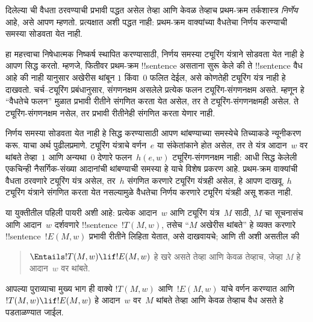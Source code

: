 \documentclass[../../../include/open-logic-section]{subfiles}
\begin{document}

दिलेल्या ची वैधता ठरवण्याची
प्रभावी पद्धत असेल तेव्हा आणि केवळ तेव्हाच
प्रथम-क्रम तर्कशास्त्र \emph{निर्णेय} आहे,
असे आपण म्हणतो. प्रत्यक्षात अशी पद्धत नाही:
प्रथम-क्रम वाक्यांच्या वैधतेचा निर्णय
करण्याची समस्या सोडवता येत नाही.

हा महत्त्वाचा निषेधात्मक निष्कर्ष स्थापित
करण्यासाठी, निर्णय समस्या ट्यूरिंग यंत्राने
सोडवता येत नाही हे आपण सिद्ध करतो.
म्हणजे, फितीवर प्रथम-क्रम !!{sentence}
असताना सुरू केले की ते !!{sentence} वैध
आहे की नाही यानुसार अखेरीस थांबून
$1$ किंवा~$0$ फलित देईल, असे कोणतेही
ट्यूरिंग यंत्र नाही हे दाखवतो.
चर्च--ट्यूरिंग प्रबंधानुसार, संगणनक्षम
असलेले प्रत्येक फलन ट्यूरिंग-संगणनक्षम
असते. म्हणून हे “वैधतेचे फलन”
मुळात प्रभावी रीतीने संगणित करता
येत असेल, तर ते ट्यूरिंग-संगणनक्षमही
असेल. ते ट्यूरिंग-संगणनक्षम नसेल,
तर प्रभावी रीतीनेही संगणित करता
येणार नाही.

निर्णय समस्या सोडवता येत नाही हे
सिद्ध करण्यासाठी आपण थांबण्याच्या
समस्येचे तिच्याकडे न्यूनीकरण करू.
याचा अर्थ पुढीलप्रमाणे. ट्यूरिंग
यंत्राचे वर्णन~$e$ या संकेतांकाने होत असेल,
तर ते यंत्र आदान~$w$ वर थांबते
तेव्हा~$1$ आणि अन्यथा~$0$ देणारे
फलन~$h(e,w)$ ट्यूरिंग-संगणनक्षम
नाही: आधी सिद्ध केलेली एकचिन्ही नैसर्गिक-संख्या आदानांची
थांबण्याची समस्या हे याचे विशेष प्रकरण आहे.
प्रथम-क्रम वाक्यांची वैधता ठरवणारे
ट्यूरिंग यंत्र असेल, तर~$h$ संगणित
करणारे ट्यूरिंग यंत्रही असेल, हे
आपण दाखवू. $h$ ट्यूरिंग यंत्राने
संगणित करता येत नसल्यामुळे वैधतेचा
निर्णय करणारे ट्यूरिंग यंत्रही असू
शकत नाही.

या युक्तीतील पहिली पायरी अशी आहे:
प्रत्येक आदान~$w$ आणि ट्यूरिंग
यंत्र~$M$ साठी, $M$ चा सूचनासंच
आणि आदान~$w$ दर्शवणारे
!!{sentence}~$!T(M, w)$,
तसेच “$M$ अखेरीस थांबते”
हे व्यक्त करणारे !!{sentence}~$!E(M, w)$ प्रभावी रीतीने
लिहिता येतात, असे दाखवायचे;
आणि ती अशी असतील की
\begin{quote}
  $\Entails !T(M, w) \lif !E(M,w)$ हे खरे असते तेव्हा आणि केवळ तेव्हाच, जेव्हा $M$ हे आदान~$w$ वर थांबते.
\end{quote}
आपल्या पुराव्याचा मुख्य भाग ही
वाक्ये $!T(M, w)$ आणि~$!E(M, w)$
यांचे वर्णन करण्यात आणि
$!T(M, w) \lif !E(M, w)$ हे
आदान~$w$ वर~$M$ थांबते तेव्हा आणि केवळ तेव्हाच
वैध असते हे पडताळण्यात जाईल.
\end{document}
